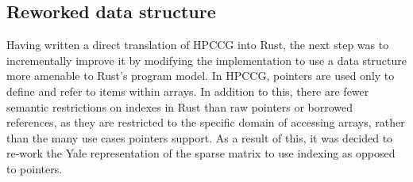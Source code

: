\subsection{Reworked data structure}
\label{sec:translation-reworked-data-structure}

Having written a direct translation of \acrshort{HPCCG} into Rust, the next step was to incrementally improve it by modifying the implementation to use a data structure more amenable to Rust's program model.
In \acrshort{HPCCG}, pointers are used only to define and refer to items within arrays. In addition to this, there are fewer semantic restrictions on indexes in Rust than raw pointers or borrowed references, as they are restricted to the specific domain of accessing arrays, rather than the many use cases pointers support. As a result of this, it was decided to re-work the Yale representation of the sparse matrix to use indexing as opposed to pointers.



